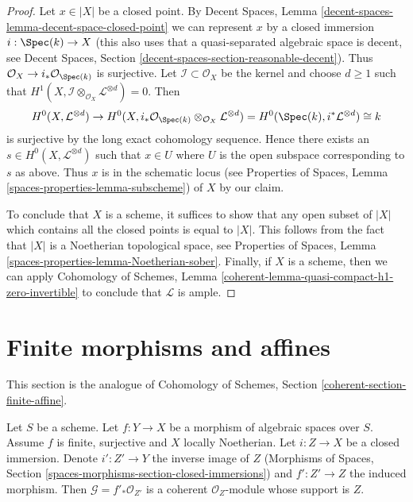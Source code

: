 \begin{proof}
\medskip\noindent
Let $x \in |X|$ be a closed point. By Decent Spaces, Lemma
\ref{decent-spaces-lemma-decent-space-closed-point}
we can represent $x$ by a closed immersion $i : \Spec(k) \to X$
(this also uses that a quasi-separated algebraic space is
decent, see Decent Spaces, Section
\ref{decent-spaces-section-reasonable-decent}).
Thus $\mathcal{O}_X \to i_*\mathcal{O}_{\Spec(k)}$ is surjective.
Let $\mathcal{I} \subset \mathcal{O}_X$ be the kernel and choose
$d \geq 1$ such that
$H^1(X, \mathcal{I} \otimes_{\mathcal{O}_X} \mathcal{L}^{\otimes d}) = 0$.
Then
$$
H^0(X, \mathcal{L}^{\otimes d}) \to
H^0(X,
i_*\mathcal{O}_{\Spec(k)} \otimes_{\mathcal{O}_X} \mathcal{L}^{\otimes d}) =
H^0(\Spec(k), i^*\mathcal{L}^{\otimes d}) \cong k
$$
is surjective by the long exact cohomology sequence. Hence
there exists an $s \in H^0(X, \mathcal{L}^{\otimes d})$
such that $x \in U$ where $U$ is the open subspace corresponding to $s$
as above. Thus $x$ is in the schematic locus
(see Properties of Spaces, Lemma \ref{spaces-properties-lemma-subscheme})
of $X$ by our claim.

\medskip\noindent
To conclude that $X$ is a scheme, it suffices to show that
any open subset of $|X|$ which contains all the closed points
is equal to $|X|$. This follows from the fact that $|X|$
is a Noetherian topological space, see
Properties of Spaces, Lemma \ref{spaces-properties-lemma-Noetherian-sober}.
Finally, if $X$ is a scheme, then we can apply
Cohomology of Schemes, Lemma
\ref{coherent-lemma-quasi-compact-h1-zero-invertible}
to conclude that $\mathcal{L}$ is ample.
\end{proof}









\section{Finite morphisms and affines}
\label{section-finite-affine}

\noindent
This section is the analogue of
Cohomology of Schemes, Section \ref{coherent-section-finite-affine}.

\begin{lemma}
\label{lemma-finite-morphism-Noetherian}
Let $S$ be a scheme. Let $f : Y \to X$ be a morphism of algebraic spaces
over $S$. Assume $f$ is finite, surjective and $X$ locally Noetherian.
Let $i : Z \to X$ be a closed immersion. Denote $i' : Z' \to Y$
the inverse image of $Z$
(Morphisms of Spaces, Section \ref{spaces-morphisms-section-closed-immersions})
and $f' : Z' \to Z$
the induced morphism. Then $\mathcal{G} = f'_*\mathcal{O}_{Z'}$
is a coherent $\mathcal{O}_Z$-module whose support is $Z$.
\end{lemma}

